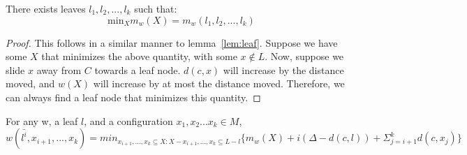 \begin{lemma}
    \label{lem:leaf2}
    There exists leaves $l_1, l_2, ..., l_k$ such that: 
    \begin{equation*}
        \mathrm{min}_X m_w(X) = m_w (l_1, l_2, ..., l_k)
    \end{equation*}
\end{lemma}

\begin{proof}
    This follows in a similar manner to lemma~\ref{lem:leaf}. Suppose we have some $X$ that minimizes the above quantity, with some $x \not \in L$. Now, suppose we slide $x$ away from $C$ towards a leaf node. $d(c, x)$ will increase by the distance moved, and $w(X)$ will increase by at most the distance moved. Therefore, we can always find a leaf node that minimizes this quantity.
\end{proof}

\begin{lemma}
    For any w, a leaf $l$, and a configuration $x_1, x_2 ... x_k \in M$, 
    \begin{equation*}
            w(\bar{l^i}, x_{i+1}, ..., x_k) = min_{x_{i+1}, ..., x_k \subseteq X : X - x_{i+1}, ... , x_k \subseteq L - l}\{ m_w(X) + i(\Delta - d(c, l)) + \Sigma_{j=i+1} ^ k d(c, x_j)\}
    \end{equation*}
\end{lemma}

